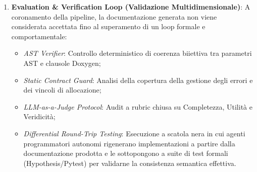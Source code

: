 \begin{enumerate}
    \item \textbf{Evaluation \& Verification Loop (Validazione Multidimensionale)}: A coronamento della pipeline, la documentazione generata non viene considerata accettata fino al superamento di un loop formale e comportamentale:
    \begin{itemize}[leftmargin=*, label=\textbullet]
        \item \emph{AST Verifier}: Controllo deterministico di coerenza biiettiva tra parametri AST e clausole Doxygen;
        \item \emph{Static Contract Guard}: Analisi della copertura della gestione degli errori e dei vincoli di allocazione;
        \item \emph{LLM-as-a-Judge Protocol}: Audit a rubric chiusa su Completezza, Utilità e Veridicità;
        \item \emph{Differential Round-Trip Testing}: Esecuzione a scatola nera in cui agenti programmatori autonomi rigenerano implementazioni a partire dalla documentazione prodotta e le sottopongono a suite di test formali (Hypothesis/Pytest) per validarne la consistenza semantica effettiva.
    \end{itemize}
\end{enumerate}

